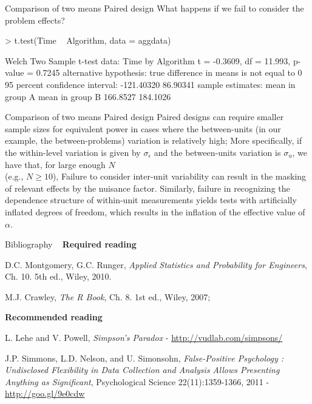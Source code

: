 \documentclass[t]{beamer}
\begin{document}

\begin{ftstf}
{Comparison of two means}
{Paired design}
What happens if we fail to consider the problem effects?
\begin{rcode}
> t.test(Time ~ Algorithm, data = aggdata)

Welch Two Sample t-test
data:  Time by Algorithm
t = -0.3609, df = 11.993, p-value = 0.7245
alternative hypothesis: true difference in means is not equal to 0
95 percent confidence interval:
 -121.40320   86.90341
sample estimates:
mean in group A mean in group B 
       166.8527        184.1026 
\end{rcode}
\end{ftstf}


\begin{ftstf}
{Comparison of two means}
{Paired design}
Paired designs can require smaller sample sizes for equivalent power in cases where the between-units (in our example, the between-problems) variation is relatively high;
\vhalf
More specifically, if the within-level variation is given by $\sigma_\epsilon$ and the between-units variation is $\sigma_u$, we have that, for large enough $N$\\(e.g., $N\geq 10$),
\beqs
{}\approx{}
\eqs
\vhalf
Failure to consider inter-unit variability can result in the masking of relevant effects by the nuisance factor.
\vhalf
Similarly, failure in recognizing the dependence structure of within-unit measurements yields tests with artificially inflated degrees of freedom, which results in the inflation of the effective value of $\alpha$.
\end{ftstf}


\begin{ftst}
{Bibliography}
{\ }
\scriptsize
\textbf{Required reading}

\benums D.C. Montgomery, G.C. Runger, \textit{Applied Statistics and Probability for Engineers}, Ch. 10. 5th ed., Wiley, 2010. 
\item M.J. Crawley, \textit{The R Book}, Ch. 8. 1st ed., Wiley, 2007;
\eenum

\textbf{Recommended reading}

\benums L. Lehe and V. Powell, \textit{Simpson's Paradox} - \url{http://vudlab.com/simpsons/} 
\item J.P. Simmons, L.D. Nelson, and U. Simonsohn, \textit{False-Positive Psychology : Undisclosed Flexibility in Data Collection and Analysis Allows Presenting Anything as Significant}, Psychological Science 22(11):1359-1366, 2011 - \url{http://goo.gl/9e0cdw}
\eenum
\end{ftst}



\end{document}
